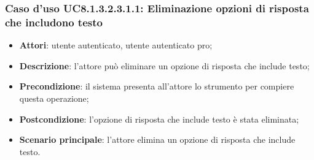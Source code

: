 \subsubsection{Caso d'uso UC8.1.3.2.3.1.1: Eliminazione opzioni di risposta che includono testo}
		\begin{itemize}
		\item
			\textbf{Attori}: utente autenticato, utente autenticato pro;
		\item		
			\textbf{Descrizione}: l'attore può eliminare un opzione di risposta che include testo;
		\item
			\textbf{Precondizione}: il sistema presenta all'attore lo strumento per compiere questa operazione;
		\item
			\textbf{Postcondizione}: l'opzione di risposta che include testo è stata eliminata;
		\item
			\textbf{Scenario principale}: l'attore elimina un opzione di risposta che include testo.				
		\end{itemize}
	
